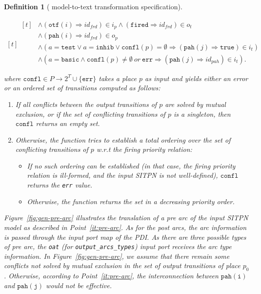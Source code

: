 \documentclass[pdflatex,sn-mathphys]{sn-jnl}%
\theoremstyle{thmstyleone}%
\theoremstyle{thmstyletwo}%
\theoremstyle{thmstylethree}%
\newtheorem{definition}{Definition}%
\begin{document}
\begin{definition}[\hilecop{} model-to-text transformation specification]
\begin{enumerate}[resume]
\begin{equation*}
\begin{aligned}[t]
\begin{aligned}[t]
                                      & \land(\mathtt{otf}(i)\Rightarrow{}id_{frd})\in{}i_p\land(\mathtt{fired}\Rightarrow{}id_{frd})\in{}o_t \\
                                      & \land(\mathtt{pah}(i)\Rightarrow{}id_{frd})\in{}o_p \\
                                      & \land(a=\mathtt{test}\lor{}a=\mathtt{inhib}\lor{}\mathtt{confl}(p)=\emptyset\Rightarrow(\mathtt{pah}(j)\Rightarrow\mathtt{true})\in{}i_t) \\
                                      & \land(a=\mathtt{basic}\land{}\mathtt{confl}(p)\neq\emptyset~or~\mathtt{err}\Rightarrow(\mathtt{pah}(j)\Rightarrow{}id_{pah})\in{}i_t). \\
                    \end{aligned} \\
      \end{aligned}
    \end{equation*}
    where $\mathtt{confl}\in{}P\rightarrow{}2^T\cup\{\mathtt{err}\}$
    takes a place $p$ as input and yields either an error or an
    ordered set of transitions computed as follows:
    \begin{enumerate}
    \item If all conflicts between the output transitions of $p$ are
      solved by mutual exclusion, or if the set of conflicting
      transitions of $p$ is a singleton, then $\mathtt{confl}$ returns
      an empty set.
    \item Otherwise, the function tries to establish a total ordering
      over the set of conflicting transitions of $p$ w.r.t the firing
      priority relation:
      \begin{itemize}
      \item If no such ordering can be established (in that case, the
        firing priority relation is ill-formed, and the input SITPN is
        not well-defined), $\mathtt{confl}$ returns the \texttt{err}
        value.
      \item Otherwise, the function returns the set in a decreasing
        priority order.
      \end{itemize}
    \end{enumerate}
    
  \end{enumerate}

  \bigskip
  
  Figure~\ref{fig:gen-pre-arc} illustrates the translation of a pre
  arc of the input SITPN model as described in Point~\ref{it:pre-arc}.
  As for the post arcs, the arc information is passed through the
  input port map of the PDI. As there are three possible types of pre
  arc, the \texttt{oat} (for \texttt{output\_arcs\_types}) input port
  receives the arc type information.  In Figure~\ref{fig:gen-pre-arc},
  we assume that there remain some conflicts not solved by mutual
  exclusion in the set of output transitions of place
  $p_0$. Otherwise, according to Point~\ref{it:pre-arc}, the
  interconnection between $\mathtt{pah(i)}$ and $\mathtt{pah(j)}$
  would not be effective.
  

\end{definition}
\end{document}

